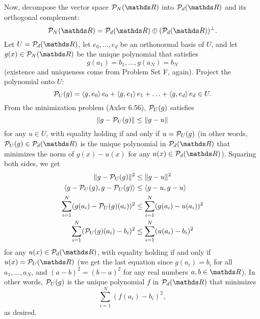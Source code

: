 \documentclass{homework}
\begin{document}
\begin{solution}
  Now, decompose the vector space $\mc{P}_N(\R)$ into $\mc{P}_d(\R)$ and its orthogonal complement:
  \[
    \mc{P}_N(\R)=\mc{P}_d(\R)\oplus (\mc{P}_d(\R))^\bot
  .\] Let $U=\mc{P}_d(\R)$, let $e_0,\ldots,e_d$ be an orthonormal basis of $U$, and let $g(x)\in
  \mc{P}_N(\R)$ be the unique polynomial that satisfies \[
    g(a_1)=b_1,\ldots,g(a_N)=b_N
  \] (existence and uniqueness come from Problem Set F, again). Project the polynomial onto
  $U$: \[
    \mathcal{P}_U(g)=\left<g,e_0 \right> e_0+\left<g,e_1 \right> e_1+\ldots+\left<g,e_d \right> e_d\in U
  .\] From the minimization problem (Axler 6.56), $\mathcal{P}_U(g)$ satisfies \[
    \|g-\mathcal{P}_U(g)\|\le \|g-u\|
  \] for any $u\in U$, with equality holding if and only if $u=\mathcal{P}_U(g)$ (in other
  words, $\mc{P}_U(g)\in \mc{P}_d(\R)$ is the unique polynomial in $\mc{P}_d(\R)$ that minimizes the
  norm of $g(x)-u(x)$ for any $u(x)\in \mc{P}_d(\R)$). Squaring
  both sides, we get
  \begin{align*}
    \|g-\mathcal{P}_U(g)\|^2&\le \|g-u\|^2\\
    \left<g-\mathcal{P}_U(g),g-\mathcal{P}_U(g) \right> &\le \left<g-u,g-u \right> \\
    \sum_{i=1}^{N} (g(a_i)-\mathcal{P}_U(g)(a_i))^2 &\le \sum_{i=1}^{N} (g(a_i)-u(a_i))^2\\
    \sum_{i=1}^{N} (\mathcal{P}_U(g)(a_i)-b_i)^2 &\le \sum_{i=1}^{N} (u(a_i)-b_i)^2
  \end{align*} for any $u(x)\in \mc{P}_d(\R)$, with equality holding if and only if
  $u(x)=\mc{P}_U(\R)$ (we get the last equation since $g(a_i)=b_i$ for all $a_1,\ldots,a_N$, and
  $(a-b)^2=(b-a)^2$ for any real numbers $a,b\in \R$). In other words, $\mathcal{P}_U(g)$ is the unique
  polynomial $f$ in $\mc{P}_d(\R)$ that minimizes \[
    \sum_{i=1}^{N} (f(a_i)-b_i)^2
  ,\] as desired.
\end{solution}
\end{document}
